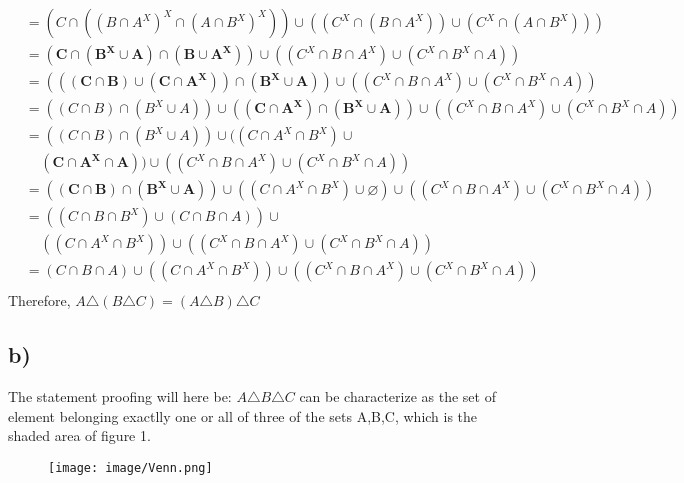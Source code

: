 \documentclass[a4paper,fleqn]{article}
\begin{document}
\begin{align*}
                                        &=(C\cap((B\cap A^X)^X \cap (A\cap B^X)^X)) \cup ((C^X\cap (B\cap A^X)) \cup (C^X\cap (A\cap B^X)))\\
                                        &=\mathbf{(C\cap (B^X\cup A)\cap (B \cup A^X))}\cup ((C^X \cap B\cap A^X)\cup (C^X\cap B^X \cap A))\\
                                        &=\mathbf{(((C\cap B)\cup (C\cap A^X)) \cap (B^X\cup A))}\cup ((C^X \cap B\cap A^X)\cup (C^X\cap B^X \cap A))\\
                                        &=((C\cap B)\cap (B^X\cup A)) \cup \mathbf{((C\cap A^X) \cap (B^X\cup A))}\cup ((C^X \cap B\cap A^X)\cup (C^X\cap B^X \cap A))\\
                                        &=((C\cap B)\cap (B^X\cup A)) \cup ((C\cap A^X \cap B^X)\cup \\ & \ \ \ \ \ \mathbf{(C\cap A^X \cap A)})\cup ((C^X \cap B\cap A^X)\cup (C^X\cap B^X \cap A))\\
                                        &=\mathbf{((C\cap B)\cap (B^X\cup A))} \cup ((C\cap A^X \cap B^X)\cup \mathbf{\varnothing})\cup ((C^X \cap B\cap A^X)\cup (C^X\cap B^X \cap A))\\
                                        &=((C\cap B \cap B^X)\cup (C \cap B \cap A))\cup\\ & \ \ \ \ \  ((C\cap A^X \cap B^X))\cup ((C^X \cap B\cap A^X)\cup (C^X\cap B^X \cap A))\\
                                        &=(C \cap B \cap A)\cup ((C\cap A^X \cap B^X))\cup ((C^X \cap B\cap A^X)\cup (C^X\cap B^X \cap A))\\
        \end{align*}
        Therefore, \(A \triangle (B \triangle C)=(A \triangle B) \triangle C\)
    \subsection*{b)}
        The statement proofing will here be: \(A\triangle B \triangle C\) 
        can be characterize as the set of element belonging exactlly one or all of three of the sets A,B,C, which is the shaded area of figure 1.
        \begin{figure}[h]
            \centering
            \texttt{[image: image/Venn.png]}
            \caption{}
        \end{figure}
        
\end{document}

